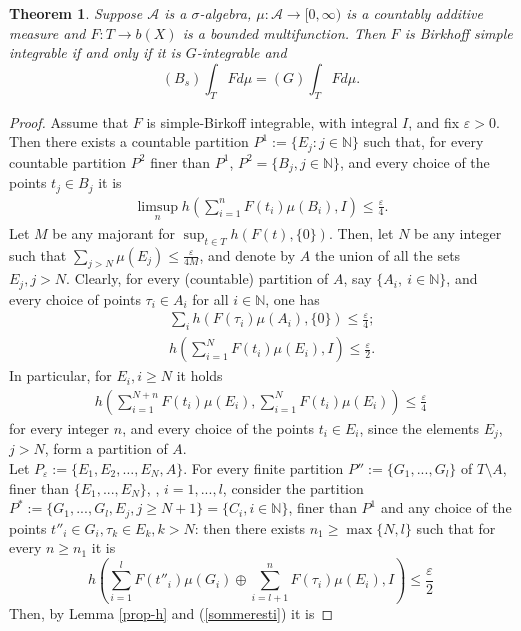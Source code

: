 \documentclass[11pt,a4paper,twoside]{amsart}
\newtheorem{theorem}{Theorem}[section]
\begin{document}
\begin{theorem}\label{ex4.1}
Suppose $\mathcal{A}$ is a $\sigma$-algebra, $\mu :\mathcal{A}\rightarrow \lbrack 0,\infty )$ 
is a countably additive measure and $F:T\rightarrow b(X)$
is a bounded multifunction. Then $F$ is Birkhoff simple integrable if and only if it is $G$-integrable and 
$$(B_s)\int_{T}Fd\mu =(G)\int_{T}Fd\mu .$$
\end{theorem}
\begin{proof} 
Assume that $F$ is simple-Birkoff integrable, with integral $I$, and fix ${\varepsilon}>0$.
 Then there exists a countable partition $P^1:=\{E_j:j\in \mathbb{N} \}$ 
such that, for every countable partition $P^2$ finer than $P^1$, $P^2=\{B_j,j\in \mathbb{N}\}$, and every choice of the points $t_j\in B_j$ it is
\begin{eqnarray}\label{limsup1}
\limsup_nh(\sum_{i=1}^nF(t_i)\mu(B_i),I)\leq \frac{\varepsilon}{4}.
\end{eqnarray}
Let $M$ be any majorant for $\sup_{t\in T}h(F(t),\{0\})$.
Then, let $N$ be any integer such that $\sum_{j> N}\mu(E_j)\leq \frac{\varepsilon}{4M}$, and denote by $A$  the union of all the sets $E_j,j>N$. 
Clearly, for every (countable) partition of $A$, say $\{A_i,\ i\in \mathbb{N}\}$, and every choice of points $\tau_i\in A_i$ for all $i\in \mathbb{N}$, one has
\begin{eqnarray}
\label{sommeresti}  && \sum_i h(F(\tau_i)\mu(A_i),\{0\})\leq \frac{\varepsilon}{4};\\
\label{segue} && h(\sum_{i=1}^NF(t_i)\mu(E_i),I)\leq \frac{\varepsilon}{2}.
\end{eqnarray}
In particular, for $E_i, i \geq N$ it holds
\begin{eqnarray}\label{sommedue}
h(\sum_{i=1}^{N+n}F(t_i)\mu(E_i),\sum_{i=1}^NF(t_i)\mu(E_i))\leq \frac{\varepsilon}{4}\end{eqnarray}
for every integer $n$, and every choice of the points $t_i\in E_i$, since the elements $E_j$, $j>N$, form a partition of $A$.\\
Let $P_{\varepsilon}:= \{E_1, E_2, \ldots, E_N, A \}$.
 For every finite partition $P'':=\{G_1,...,G_l\}$ of $T\setminus A$, finer than $\{E_1,...,E_N\}$, , $i=1,...,l$,
consider the partition $P^*:=\{G_1,...,G_l,E_{j}, j \geq N+1\}=\{C_i, i \in \mathbb{N}\}$, finer than $P^1$ and
any choice of the points $t''_i\in G_i, \tau_k \in E_k, k>N$:
then there exists $n_1 \geq \max \{N, l \}$ such that for every $n \geq n_1$ it is 
\[ h(\sum_{i=1}^{l} F(t''_i)\mu(G_i) \oplus \sum_{i=l+1}^{n} F(\tau_i)\mu(E_i) ,I)\leq \frac{\varepsilon}{2}
\]
Then, by Lemma \ref{prop-h} and (\ref{sommeresti}) it is


\end{proof}
\end{document}
